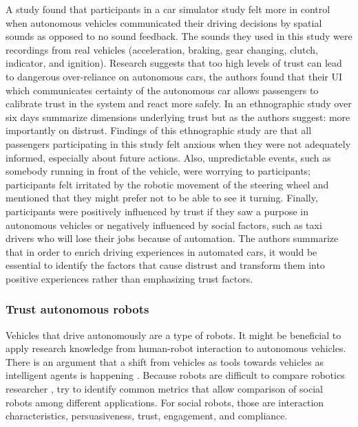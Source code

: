 A study \cite{Beattie} found that participants in a car simulator study felt more in control when autonomous vehicles communicated their driving decisions by spatial sounds as opposed to no sound feedback. The sounds they used in this study were recordings from real vehicles (acceleration, braking, gear changing, clutch, indicator, and ignition). Research \cite{Helldin2013PresentingDriving} suggests that too high levels of trust can lead to dangerous over-reliance on autonomous cars, the authors found that their UI which communicates certainty of the autonomous car allows passengers to calibrate trust in the system and react more safely. In an ethnographic study over six days \cite{Lee2016} summarize dimensions underlying trust but as the authors suggest: more importantly on distrust.  Findings of this ethnographic study are that all passengers participating in this study felt anxious when they were not adequately informed, especially about future actions. Also, unpredictable events, such as somebody running in front of the vehicle, were worrying to participants; participants felt irritated by the robotic movement of the steering wheel and mentioned that they might prefer not to be able to see it turning. Finally, participants were positively influenced by trust if they saw a purpose in autonomous vehicles or negatively influenced by social factors, such as taxi drivers who will lose their jobs because of automation. The authors summarize that in order to enrich driving experiences in automated cars, it would be essential to identify the factors that cause distrust and transform them into positive experiences rather than emphasizing trust factors. 

\subsubsection{Trust autonomous robots}
Vehicles that drive autonomously are a type of robots. It might be beneficial to apply research knowledge from human-robot interaction to autonomous vehicles. There is an argument that a shift from vehicles as tools towards vehicles as intelligent agents is happening \cite{Thill}. Because robots are difficult to compare robotics researcher \cite{Steinfeld2006}, try to identify common metrics that allow comparison of social robots among different applications. For social robots, those are interaction characteristics, persuasiveness, trust, engagement, and compliance. 

